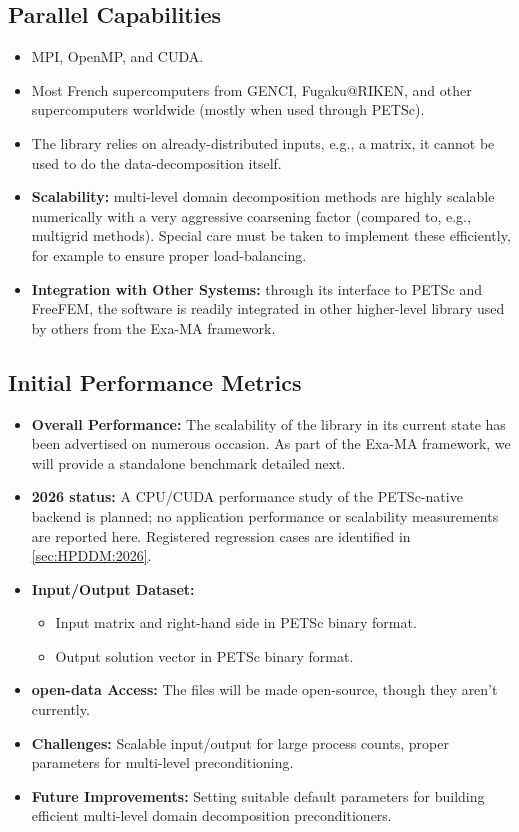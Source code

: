 \subsection{Parallel Capabilities}
\label{sec:WP3:HPDDM:performances}


\begin{itemize}
    \item MPI, OpenMP, and CUDA.
    \item Most French supercomputers from GENCI, Fugaku@RIKEN, and other supercomputers worldwide (mostly when used through PETSc).
    \item The library relies on already-distributed inputs, e.g., a matrix, it cannot be used to do the data-decomposition itself.
    \item \textbf{Scalability:} multi-level domain decomposition methods are highly scalable numerically with a very aggressive coarsening factor (compared to, e.g., multigrid methods). Special care must be taken to implement these efficiently, for example to ensure proper load-balancing.
    \item \textbf{Integration with Other Systems:} through its interface to PETSc and FreeFEM, the software is readily integrated in other higher-level library used by others from the Exa-MA framework.
\end{itemize}


\subsection{Initial Performance Metrics}
\label{sec:WP3:HPDDM:metrics}

\begin{itemize}
    \item \textbf{Overall Performance:} The scalability of the library in its current state has been advertised on numerous occasion. As part of the Exa-MA framework, we will provide a standalone benchmark detailed next.
    \item \textbf{2026 status:} A CPU/CUDA performance study of the PETSc-native backend is planned; no application performance or scalability measurements are reported here. Registered regression cases are identified in \cref{sec:HPDDM:2026}.
    \item \textbf{Input/Output Dataset:}
        \begin{itemize}
            \item Input matrix and right-hand side in PETSc binary format.
            \item Output solution vector in PETSc binary format.
        \end{itemize}
    \item \textbf{open-data Access:} The files will be made open-source, though they aren't currently.
    \item \textbf{Challenges:} Scalable input/output for large process counts, proper parameters for multi-level preconditioning.
    \item \textbf{Future Improvements:} Setting suitable default parameters for building efficient multi-level domain decomposition preconditioners.
\end{itemize}

